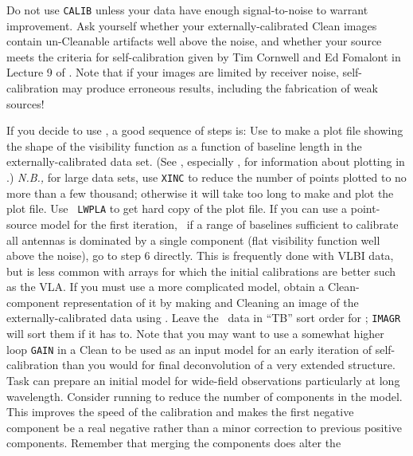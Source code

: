       Do not use {\tt CALIB} unless your data have enough
signal-to-noise to warrant improvement.  Ask yourself whether your
externally-calibrated Clean images contain un-Cleanable artifacts well
above the noise, and whether your source meets the criteria for
self-calibration given by Tim Cornwell and Ed Fomalont in Lecture 9 of
{\it {}\/}.  Note that if
your images are limited by receiver noise, self-calibration may
produce erroneous results, including the fabrication of weak sources!


      If you decide to use , a good sequence of
steps is:
\xben
\Item Use {\tt {}} to make a plot file showing the shape of
   the visibility function as a function of baseline length in the
   externally-calibrated data set.  (See , especially
   , for information about plotting in \AIPS\@.)
   {\it N.B.,\/} for large data sets, use {\tt XINC} to reduce the
   number of points plotted to no more than a few thousand; otherwise
   it will take too long to make and plot the plot file. Use {\tt
   LWPLA} to get hard copy of the plot file.
\Item If you can use a point-source model for the first iteration,
   \ie\ if a range of baselines sufficient to calibrate all antennas
   is dominated by a single component (flat visibility function well
   above the noise), go to step 6 directly.  This is frequently done
   with VLBI data, but is less common with arrays for which the
   initial calibrations are better such as the VLA\@.
\Item If you must use a more complicated model, obtain a
   Clean-component representation of it by making and Cleaning an
   image of the externally-calibrated data using {\tt {}}\@.
   Leave the \uv\ data in ``TB'' sort order for {\tt {}};
   {\tt IMAGR} will sort them if it has to.  Note that you may want to
   use a somewhat higher loop {\tt GAIN} in a Clean to be used as an
   input model for an early iteration of self-calibration than you
   would for final deconvolution of a very extended structure.  Task
   {\tt {}} can prepare an initial model for wide-field
   observations particularly at long wavelength.
\Item Consider running {\tt {}} to reduce the number of
   components in the model.  This improves the speed of the
   calibration and makes the first negative component be a real
   negative rather than a minor correction to previous positive
   components.  Remember that merging the components does alter the
